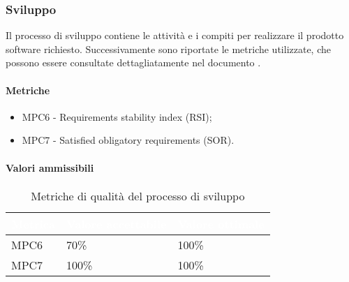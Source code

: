 \subsubsection{Sviluppo}
Il processo di sviluppo contiene le attività e i compiti per realizzare il prodotto software richiesto. Successivamente sono riportate le metriche utilizzate, che possono essere consultate dettagliatamente nel documento .

\paragraph{Metriche}
\begin{itemize}
	\item MPC6 - Requirements stability index (RSI);
	\item MPC7 - Satisfied obligatory requirements (SOR).
\end{itemize}


\paragraph{Valori ammissibili}
{
\renewcommand{\arraystretch}{1.5}
\centering
\begin{longtable}{C{2.5cm} C{4cm} C{4cm}}
\textcolor{white}{\textbf{Metrica}}&
\textcolor{white}{\textbf{Valore accettabile}}&
\textcolor{white}{\textbf{Valore ottimale}}\\	
\endhead
\endfoot
{}\caption{Metriche di qualità del processo di sviluppo}
\endlastfoot

MPC6 & 70\% & 100\% \\
MPC7 & 100\% & 100\%
\end{longtable}
}

